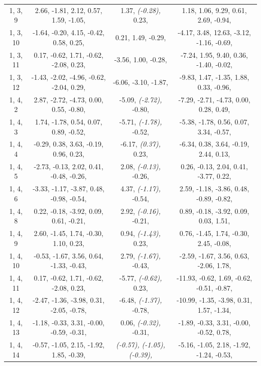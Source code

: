 \documentclass[compress]{beamer}
\begin{document}
\begin{frame}
{\begin{tabular}{c c c c}
1, 3, 9 &  2.66,   -1.81,   2.12,   0.57,   1.59,   -1.05,  &  1.37,   {\it (-0.28),}   0.23,  &  1.18,   1.06,   9.29,   0.61,   2.69,   -0.94,  \\
1, 3, 10 &  -1.64,   -0.20,   4.15,   -0.42,   0.58,   0.25,  &  0.21,   1.49,   -0.29,  &  -4.17,   3.48,   12.63,   -3.12,   -1.16,   -0.69,  \\
1, 3, 11 &  0.17,   -0.62,   1.71,   -0.62,   -2.08,   0.23,  &  -3.56,   1.00,   -0.28,  &  -7.24,   1.95,   9.40,   0.36,   -1.40,   -0.02,  \\
1, 3, 12 &  -1.43,   -2.02,   -4.96,   -0.62,   -2.04,   0.29,  &  -6.06,   -3.10,   -1.87,  &  -9.83,   1.47,   -1.35,   1.88,   0.33,   -0.96,  \\
1, 4, 2 &  2.87,   -2.72,   -4.73,   0.00,   0.55,   -0.80,  &  -5.09,   {\it (-2.72),}   -0.80,  &  -7.29,   -2.71,   -4.73,   0.00,   0.28,   0.49,  \\
1, 4, 3 &  1.74,   -1.78,   0.54,   0.07,   0.89,   -0.52,  &  -5.71,   {\it (-1.78),}   -0.52,  &  -5.38,   -1.78,   0.56,   0.07,   3.34,   -0.57,  \\
1, 4, 4 &  -0.29,   0.38,   3.63,   -0.19,   0.96,   0.23,  &  -6.17,   {\it (0.37),}   0.23,  &  -6.34,   0.38,   3.64,   -0.19,   2.44,   0.13,  \\
1, 4, 5 &  -2.73,   -0.13,   2.02,   0.41,   -0.48,   -0.26,  &  2.08,   {\it (-0.13),}   -0.26,  &  0.26,   -0.13,   2.04,   0.41,   -3.77,   0.22,  \\
1, 4, 6 &  -3.33,   -1.17,   -3.87,   0.48,   -0.98,   -0.54,  &  4.37,   {\it (-1.17),}   -0.54,  &  2.59,   -1.18,   -3.86,   0.48,   -0.89,   -0.82,  \\
1, 4, 8 &  0.22,   -0.18,   -3.92,   0.09,   0.61,   -0.21,  &  2.92,   {\it (-0.16),}   -0.21,  &  0.89,   -0.18,   -3.92,   0.09,   0.03,   1.51,  \\
1, 4, 9 &  2.60,   -1.45,   1.74,   -0.30,   1.10,   0.23,  &  0.94,   {\it (-1.43),}   0.23,  &  0.76,   -1.45,   1.74,   -0.30,   2.45,   -0.08,  \\
1, 4, 10 &  -0.53,   -1.67,   3.56,   0.64,   -1.33,   -0.43,  &  2.79,   {\it (-1.67),}   -0.43,  &  -2.59,   -1.67,   3.56,   0.63,   -2.06,   1.78,  \\
1, 4, 11 &  0.17,   -0.62,   1.71,   -0.62,   -2.08,   0.23,  &  -5.77,   {\it (-0.62),}   0.23,  &  -11.93,   -0.62,   1.69,   -0.62,   -0.51,   -0.87,  \\
1, 4, 12 &  -2.47,   -1.36,   -3.98,   0.31,   -2.05,   -0.78,  &  -6.48,   {\it (-1.37),}   -0.78,  &  -10.99,   -1.35,   -3.98,   0.31,   1.57,   -1.34,  \\
1, 4, 13 &  -1.18,   -0.33,   3.31,   -0.00,   -0.59,   -0.31,  &  0.06,   {\it (-0.32),}   -0.31,  &  -1.89,   -0.33,   3.31,   -0.00,   -0.52,   0.78,  \\
1, 4, 14 &  -0.57,   -1.05,   2.15,   -1.92,   1.85,   -0.39,  &  {\it (-0.57),}   {\it (-1.05),}   {\it (-0.39),}  &  -5.16,   -1.05,   2.18,   -1.92,   -1.24,   -0.53,  \\
\end{tabular}}


\end{frame}
\end{document}
